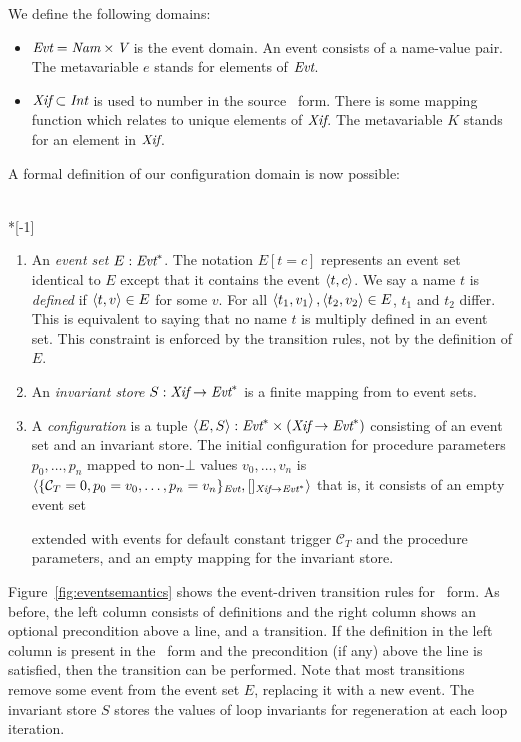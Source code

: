\documentclass[12pt,titlepage,twoside]{article}
\newcommand{\ignore}[1]{}
\begin{document}
We define the following domains:
\begin{itemize}
\item ${\mbox{\em Evt}} = {\mbox{\em Nam}} \times {\mbox{\em V}}$ is the event
domain.  An event consists of a name-value pair.  The metavariable $e$
stands for elements of ${\mbox{\em Evt}}$.
\item ${\mbox{\em Xif}} \subset {\mbox{\em Int}}$ is used to number
 in the source \ssiplus\ form.  There is some mapping
function which relates  to unique elements of
${\mbox{\em Xif}}$.  The metavariable $K$ stands for an element in
${\mbox{\em Xif}}$.
\end{itemize}

A formal definition of our configuration domain is now possible:
\begin{definition}~\\*[-1\baselineskip]
\begin{enumerate}
\item An \emph{event set} $E:{\mbox{\em Evt}}^*$.
The notation $E[t=c]$ represents an event set
identical to $E$ except that it contains the event $\left\langle t,c \right\rangle$.  We
say a name $t$ is \emph{defined} if $\left\langle t,v \right\rangle \in E$ for some $v$.
For all $\left\langle t_1,v_1 \right\rangle,\left\langle t_2,v_2 \right\rangle \in E$, $t_1$ and $t_2$
differ.  This is equivalent to saying that no name $t$ is multiply
defined in an event set.  This constraint is enforced by the
transition rules, not by the definition of $E$.
\item An \emph{invariant store} $S: {\mbox{\em Xif}} \to
{\mbox{\em Evt}}^*$ is a finite mapping from  to event sets.
\item A \emph{configuration} is a tuple
$\left\langle E, S \right\rangle:{\mbox{\em Evt}}^* \times ({\mbox{\em Xif}}\to{\mbox{\em Evt}}^*)$ consisting
of an event set and an invariant store.  The initial
configuration for procedure parameters $p_0,\ldots,p_n$ mapped to
non-$\bot$ values $v_0,\ldots,v_n$ is
$\left\langle \{\mathcal{C}_T=0,p_0=v_0,\ldots,p_n=v_n\}_{{\mbox{\scriptsize\em Evt}}},
        []_{{\mbox{\scriptsize\em Xif}} \to {\mbox{\scriptsize\em Evt}}^*} \right\rangle$
that is, it consists of an empty event set%
\ignore{\footnote{Read, ``who cares about Maria'' \cite{marinov99}.}}
extended with events for default constant trigger $\mathcal{C}_T$
and the procedure parameters,
and an empty mapping for the invariant store.%
\end{enumerate}
\end{definition}

Figure~\vref{fig:eventsemantics} shows the event-driven transition
rules for \ssiplus\ form.  As before, the left column consists of
definitions and the right column shows an optional precondition above
a line, and a transition.  If the definition in the left column is
present in the \ssiplus\ form and the precondition (if any) above the
line is satisfied, then the transition can be performed.  Note that
most transitions remove some event from the event set $E$, replacing
it with a new event.  The invariant store $S$ stores
the values of loop invariants for regeneration at each loop iteration.
\end{document}
